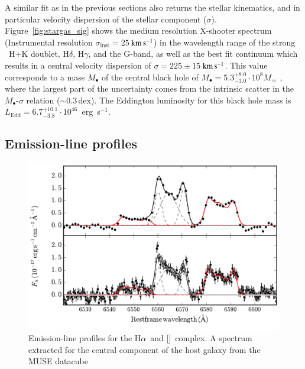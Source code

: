 \documentclass[traditabstract]{aa}
\newcommand{\kms}{$\rm{km\,s^{-1}}$}
\newcommand{\ha}{H$\alpha$}
\newcommand{\hg}{H$\gamma$}
\newcommand{\hd}{H$\delta$}
\newcommand{\nii}{[\ion{N}{ii}]}
\begin{document}
A similar fit as in the previous sections also returns the stellar kinematics, and in particular velocity dispersion of the stellar component ($\sigma$). Figure~\ref{fig:stargas_sig} shows the medium resolution X-shooter spectrum (Instrumental resolution $\sigma_{\mathrm{inst}}=25$\,\kms) in the wavelength range of the strong ~H+K doublet, \hd, \hg, and the G-band, as well as the best fit continuum which results in a central velocity dispersion of $\sigma=225\pm15$\,\kms. This value corresponds to a mass $M_\bullet$ of the central black hole of $M_\bullet = 5.3_{-3.0}^{+8.0}\cdot10^{8} M_\sun$ \citep[Eq. 3, 5 or 7 in][]{2013ARA&A..51..511K}, where the largest part of the uncertainty comes from the intrinsic scatter in the $M_\bullet$-$\sigma$ relation ($\sim0.3$\,dex). The Eddington luminosity for this black hole mass is $L_{\mathrm{Edd}}=6.7_{-3.8}^{+10.1}\cdot10^{46}$~erg~s$^{-1}$.


\subsection{Emission-line profiles}
\label{sec:prof}

\begin{figure}
  \includegraphics[width=0.999\linewidth]{fig/MUSE_XS_lineshape.pdf}
\caption{Emission-line profiles for the \ha\, and \nii\, complex. A spectrum extracted for the central component of the host galaxy from the MUSE datacube}
\label{fig:hanii}
\end{figure}
\end{document}
